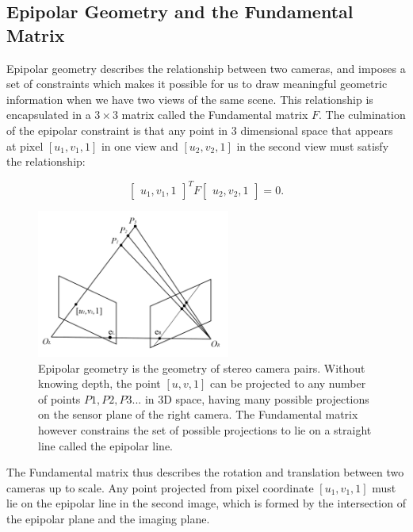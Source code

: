\subsection{Epipolar Geometry and the Fundamental Matrix}

Epipolar geometry describes the relationship between two cameras, and imposes a set of constraints which makes it possible for us to draw meaningful geometric information when we have two views of the same scene. This relationship is encapsulated in a $3 \times 3$ matrix called the Fundamental matrix $F$. The culmination of the epipolar constraint is that any point in 3 dimensional space that appears at pixel $[u_1, v_1, 1]$ in one view and $[u_2, v_2, 1]$ in the second view must satisfy the relationship:

\begin{equation}
    \begin{bmatrix}
        u_1, v_1, 1
    \end{bmatrix}^T
    F
    \begin{bmatrix}
        u_2, v_2, 1
    \end{bmatrix}
    = 0.
\end{equation}

\begin{figure}
    \centering
    \includegraphics[width=2.5in]{images/epipolarplane.png}
    \caption[The fundamental matrix in epipolar geometry]{Epipolar geometry is the geometry of stereo camera pairs. Without knowing depth, the point $[u,v,1]$ can be projected to any number of points $P1, P2, P3... $ in 3D space, having many possible projections on the sensor plane of the right camera. The Fundamental matrix however constrains the set of possible projections to lie on a straight line called the epipolar line.}
    \label{epipolarplane}
\end{figure}

The Fundamental matrix thus describes the rotation and translation between two cameras up to scale. Any point projected from pixel coordinate $[u_1, v_1, 1]$ must lie on the epipolar line in the second image, which is formed by the intersection of the epipolar plane and the imaging plane. 



